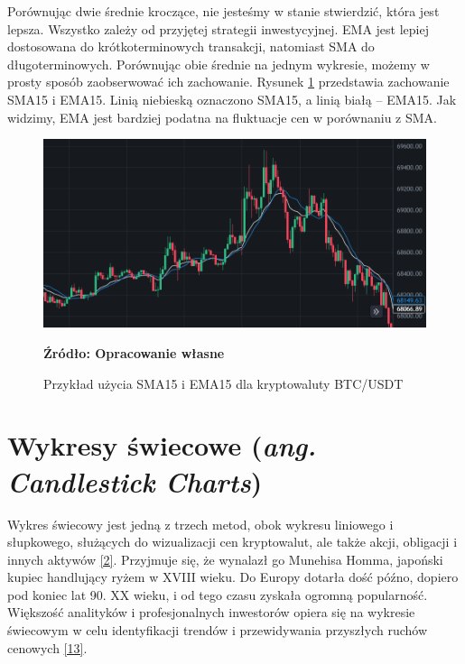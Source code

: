 \documentclass[12pt,a4paper,twoside, inzynierska]{pwr_wmat_praca_dyplomowa}
\theoremstyle{plain}
\numberwithin{theorem}{chapter}
\theoremstyle{definition}
\numberwithin{theorem}{chapter}
\begin{document}
	Porównując dwie średnie kroczące, nie jesteśmy w stanie stwierdzić, która jest lepsza. Wszystko zależy od przyjętej strategii inwestycyjnej. EMA jest lepiej dostosowana do krótkoterminowych transakcji, natomiast SMA do długoterminowych. Porównując obie średnie na jednym wykresie, możemy w prosty sposób zaobserwować ich zachowanie. Rysunek \ref{fig:EMAiSMA}  przedstawia zachowanie SMA15 i EMA15. Linią niebieską oznaczono SMA15, a linią białą – EMA15. Jak widzimy, EMA jest bardziej podatna na fluktuacje cen w porównaniu z SMA.
	\begin{figure}[H]
		\centering
		\includegraphics[width=1\textwidth]{EMAiSMA.png}
		\caption{Przykład użycia SMA15 i EMA15 dla kryptowaluty BTC/USDT}
		\label{fig:EMAiSMA}
		\textbf{Źródło: Opracowanie własne}
	\end{figure}
	\vspace{12pt}
	

	\section{Wykresy świecowe (\textit{ang. Candlestick Charts})}
	
	Wykres świecowy jest jedną z trzech metod, obok wykresu liniowego i słupkowego, służących do wizualizacji cen kryptowalut, ale także akcji, obligacji i innych aktywów \hyperref[info2]{[2]}. Przyjmuje się, że wynalazł go Munehisa Homma, japoński kupiec handlujący ryżem w XVIII wieku. Do Europy dotarła dość późno, dopiero pod koniec lat 90. XX wieku, i od tego czasu zyskała ogromną popularność. Większość analityków i profesjonalnych inwestorów opiera się na wykresie świecowym w celu identyfikacji trendów i przewidywania przyszłych ruchów cenowych \hyperref[info13]{[13]}.\newline
	
\end{document}
